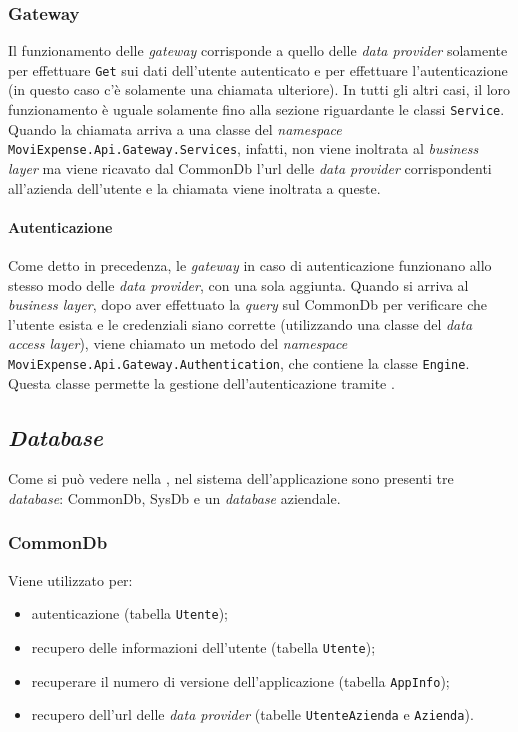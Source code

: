 \subsubsection{Gateway}

Il funzionamento delle  \textit{gateway} corrisponde a quello delle \textit{data provider} solamente per effettuare \texttt{Get} sui dati dell'utente autenticato e per effettuare l'autenticazione (in questo caso c'è solamente una chiamata ulteriore). In tutti gli altri casi, il loro funzionamento è uguale solamente fino alla sezione riguardante le classi \texttt{Service}. Quando la chiamata arriva a una classe del \textit{namespace} \texttt{MoviExpense.Api.Gateway.Services}, infatti, non viene inoltrata al \textit{business layer} ma viene ricavato dal CommonDb l'url delle  \textit{data provider} corrispondenti all'azienda dell'utente e la chiamata viene inoltrata a queste.

\paragraph{Autenticazione} Come detto in precedenza, le  \textit{gateway} in caso di autenticazione funzionano allo stesso modo delle \textit{data provider}, con una sola aggiunta. Quando si arriva al \textit{business layer}, dopo aver effettuato la \textit{query} sul CommonDb per verificare che l'utente esista e le credenziali siano corrette (utilizzando una classe del \textit{data access layer}), viene chiamato un metodo del \textit{namespace} \texttt{MoviExpense.Api.Gateway.Authentication}, che contiene la classe \texttt{Engine}. Questa classe permette la gestione dell'autenticazione tramite .


\subsection{\textit{Database}}

Come si può vedere nella , nel sistema dell'applicazione sono presenti tre \textit{database}: CommonDb, SysDb e un \textit{database} aziendale.

\subsubsection{CommonDb}

Viene utilizzato per:
\begin{itemize}
    \item autenticazione (tabella \texttt{Utente});
    \item recupero delle informazioni dell'utente (tabella \texttt{Utente});
    \item recuperare il numero di versione dell'applicazione (tabella \texttt{AppInfo});
    \item recupero dell'url delle  \textit{data provider} (tabelle \texttt{UtenteAzienda} e \texttt{Azienda}).
\end{itemize}

